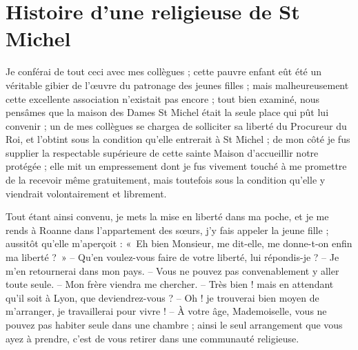 \documentclass[11pt,a4paper]{report}
\begin{document}
\section*{Histoire d'une religieuse de St Michel}

Je conférai de tout ceci avec mes collègues ; cette pauvre enfant eût été un véritable gibier de l'œuvre du patronage des jeunes filles ; mais malheureusement cette excellente association n'existait pas encore ; tout bien examiné, nous pensâmes que la maison des Dames St Michel était la seule place qui pût lui convenir ; un de mes collègues se chargea de solliciter sa liberté du Procureur du Roi, et l'obtint sous la condition qu'elle entrerait à St Michel ; de mon côté je fus supplier la respectable supérieure de cette sainte Maison d'accueillir notre protégée ; elle mit un empressement dont je fus vivement touché à me promettre de la recevoir même gratuitement, mais toutefois sous la condition qu'elle y viendrait volontairement et librement.

Tout étant ainsi convenu, je mets la mise en liberté dans ma poche, et je me rends à Roanne dans l'appartement des sœurs, j'y fais appeler la jeune fille ; aussitôt qu'elle m'aperçoit : «~Eh bien Monsieur, me dit-elle, me donne-t-on enfin ma liberté ?~»
-- Qu'en voulez-vous faire de votre liberté, lui répondis-je ?
-- Je m'en retournerai dans mon pays.
-- Vous ne pouvez pas convenablement y aller toute seule.
-- Mon frère viendra me chercher.
-- Très bien ! mais en attendant qu'il soit à Lyon, que deviendrez-vous ?
-- Oh ! je trouverai bien moyen de m'arranger, je travaillerai pour vivre !
-- À votre âge, Mademoiselle, vous ne pouvez pas habiter seule dans une chambre ; ainsi le seul arrangement que vous ayez à prendre, c'est de vous retirer dans une communauté religieuse.
\end{document}
